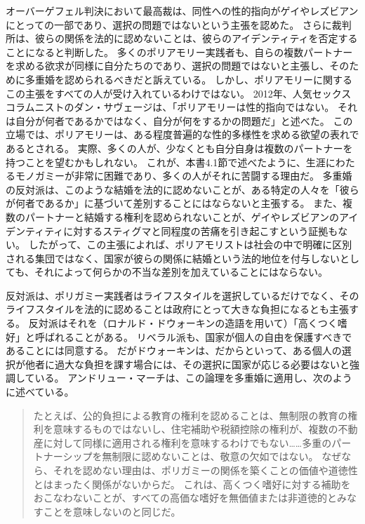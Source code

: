 \documentclass[paper=a4,book,openany]{jlreq}
\newcommand{\ig}[1]{}           %
\begin{document}
オーバーゲフェル判決において最高裁は、同性への性的指向がゲイやレズビアンにとっての一部であり、選択の問題ではないという主張を認めた。
さらに裁判所は、彼らの関係を法的に認めないことは、彼らのアイデンティティを否定することになると判断した。
多くのポリアモリー実践者も、自らの複数パートナーを求める欲求が同様に自分たちのであり、選択の問題ではないと主張し、そのために多重婚を認められるべきだと訴えている。
しかし、ポリアモリーに関するこの主張をすべての人が受け入れているわけではない。
2012年、人気セックスコラムニストのダン・サヴェージは、「ポリアモリーは性的指向ではない。
それは自分が何者であるかではなく、自分が何をするかの問題だ」と述べた\citep{savage12:_savag_busted}。
この立場では、ポリアモリーは、ある程度普遍的な性的多様性を求める欲望の表れであるとされる。
実際、多くの人が、少なくとも自分自身は複数のパートナーを持つことを望むかもしれない。
これが、本書4.1節で述べたように、生涯にわたるモノガミーが非常に困難であり、多くの人がそれに苦闘する理由だ。
多重婚の反対派は、このような結婚を法的に認めないことが、ある特定の人々を「彼らが何者であるか」に基づいて差別することにはならないと主張する。
また、複数のパートナーと結婚する権利を認められないことが、ゲイやレズビアンのアイデンティティに対するスティグマと同程度の苦痛を引き起こすという証拠もない。
したがって、この主張によれば、ポリアモリストは社会の中で明確に区別される集団ではなく、国家が彼らの関係に結婚という法的地位を付与しないとしても、それによって何らかの不当な差別を加えていることにはならない。

反対派は、ポリガミー実践者はライフスタイルを選択しているだけでなく、そのライフスタイルを法的に認めることは政府にとって大きな負担になるとも主張する。
反対派はそれを（ロナルド・ドウォーキン\ig{Ronald Dworkin}の造語を用いて）「高くつく嗜好」と呼ばれることがある。
リベラル派も、国家が個人の自由を保護すべきであることには同意する。
だがドウォーキンは、だからといって、ある個人の選択が他者に過大な負担を課す場合には、その選択に国家が応じる必要はないと強調している\citep[p.229]{dworkin81:_what_is_equal}。
アンドリュー・マーチは、この論理を多重婚に適用し、次のように述べている。

\begin{quote}
たとえば、公的負担による教育の権利を認めることは、無制限の教育の権利を意味するものではないし、住宅補助や税額控除の権利が、複数の不動産に対して同様に適用される権利を意味するわけでもない……多重のパートナーシップを無制限に認めないことは、敬意の欠如ではない。
なぜなら、それを認めない理由は、ポリガミーの関係を築くことの価値や道徳性とはまったく関係がないからだ。
これは、高くつく嗜好に対する補助をおこなわないことが、すべての高価な嗜好を無価値または非道徳的とみなすことを意味しないのと同じだ。
\citep[p.249]{march11:_is_there_right_polyg}
\end{quote}
\end{document}
